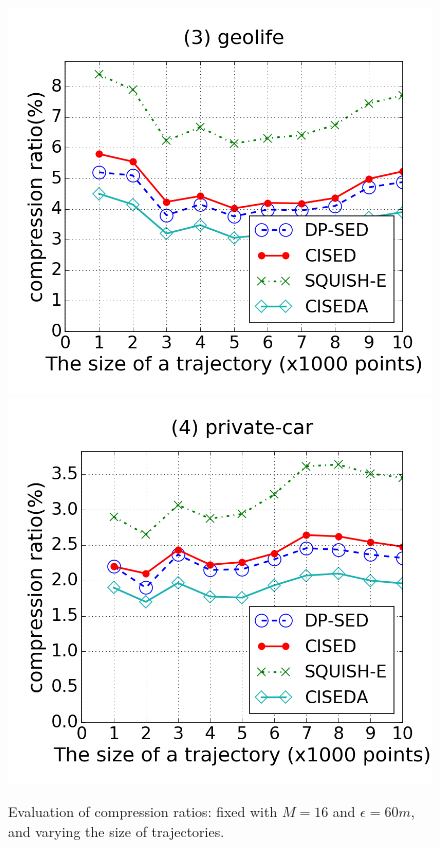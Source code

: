 \begin{figure}[tb!]
\includegraphics[scale = 0.250]{figures/Exp-CR-size-geolife.png}
\includegraphics[scale = 0.250]{figures/Exp-CR-size-private.png}
\vspace{-2ex}
\caption{\small Evaluation of compression ratios: fixed with $M=16$ and $\epsilon=60m$, and varying the size of trajectories.}
\label{fig:cr-size}
\vspace{-2ex}
\end{figure}

